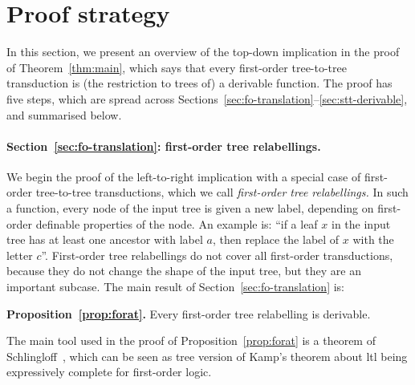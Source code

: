 \section{Proof strategy}
\label{sec:strategy}
In this section, we present an overview of the top-down implication in the  proof of Theorem~\ref{thm:main}, which says that every first-order tree-to-tree transduction is (the restriction to trees of) a derivable function. The proof has five steps, which are spread across Sections~\ref{sec:fo-translation}--\ref{sec:stt-derivable}, and summarised below.

\newcommand{\announce}[2]{
\begin{center}
    {\bf #1.} #2
\end{center}
}



  \paragraph*{Section~\ref{sec:fo-translation}: first-order tree relabellings.} We begin the proof of the left-to-right  implication  with a special case of first-order tree-to-tree transductions, which we call \emph{first-order  tree relabellings.} In such a  function, every node of the input tree  is given a new label, depending on first-order definable properties of the node. An example is:  ``if a leaf $x$ in the input tree has at least one ancestor with label $a$, then replace the label of $x$ with the letter $c$''. First-order tree relabellings  do not cover all first-order transductions, because they do not change the shape of the input tree, but they are an important subcase.
    The main result of Section~\ref{sec:fo-translation} is:
    \announce
    {Proposition~\ref{prop:forat}}
    {Every first-order tree relabelling is derivable.}
    The main tool used in the proof of Proposition~\ref{prop:forat} is a theorem of Schlingloff~\cite[Theorem 2.6]{schlingloff1992expressive}, which can be seen as tree version of Kamp's theorem about {\sc ltl} being  expressively complete for first-order logic.  
    
    

